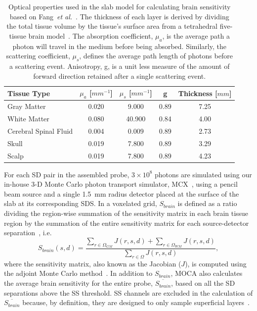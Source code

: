 \begin{table}
\centering
\caption{Optical properties used in the slab model for calculating brain sensitivity based on Fang~\emph{et al.}~\cite{Fang2010}. The thickness of each layer is derived by dividing the total tissue volume by the tissue's surface area from a tetrahedral five-tissue brain model~\cite{Sanchez2012}. The absorption coefficient, $\mu_{a}$, is the average path a photon will travel in the medium before being absorbed. Similarly, the scattering coefficient, $\mu_{s}$, defines the average path length of photons before a scattering event. Anisotropy, g, is a unit less measure of the amount of forward direction retained after a single scattering event.}
\label{tab:opticalproperties}
\begin{tabular}{@{}lcccc@{}}
\toprule
Tissue Type  & $\mu_{a}$ [$mm^{-1}$] & $\mu_{s}$ [$mm^{-1}$] & g    & Thickness [$mm$] \\ \midrule
Gray Matter                     & 0.020      & 9.000      & 0.89 & 7.25           \\
White Matter                    & 0.080      & 40.900     & 0.84 & 4.00           \\
Cerebral Spinal Fluid           & 0.004      & 0.009      & 0.89 & 2.73           \\
Skull                           & 0.019      & 7.800      & 0.89 & 3.29           \\
Scalp                           & 0.019      & 7.800      & 0.89 & 4.23           \\ \bottomrule
\end{tabular}
\end{table}

For each SD pair in the assembled probe, $3\times10^{8}$ photons are simulated using our in-house 3-D Monte Carlo photon transport simulator, MCX~\cite{Fang2009}, using a pencil beam source and a single 1.5~mm radius detector placed at the surface of the slab at its corresponding SDS. In a voxelated grid, $S_{brain}$ is defined as a ratio dividing the region-wise summation of the sensitivity matrix in each brain tissue region by the summation of the entire sensitivity matrix for each source-detector separation~\cite{Brigadoi2015}, i.e.
\begin{equation}
\label{eq:fov}
S_{brain}(s,d) = \frac{\sum_{r\in\Omega_{GM}}J(r,s,d) + \sum_{r\in\Omega_{WM}}J(r,s,d)} {\sum_{r\in\Omega}J(r,s,d)},
\end{equation}
where the sensitivity matrix, also known as the Jacobian ($J$), is computed using the adjoint Monte Carlo method~\cite{Yao2018}. In addition to $S_{brain}$, MOCA also calculates the average brain sensitivity for the entire probe, $\overline{S_{brain}}$, based on all the SD separations above the SS threshold. SS channels are excluded in the calculation of $\overline{S_{brain}}$ because, by definition, they are designed to only sample superficial layers~\cite{Brigadoi2015}.

